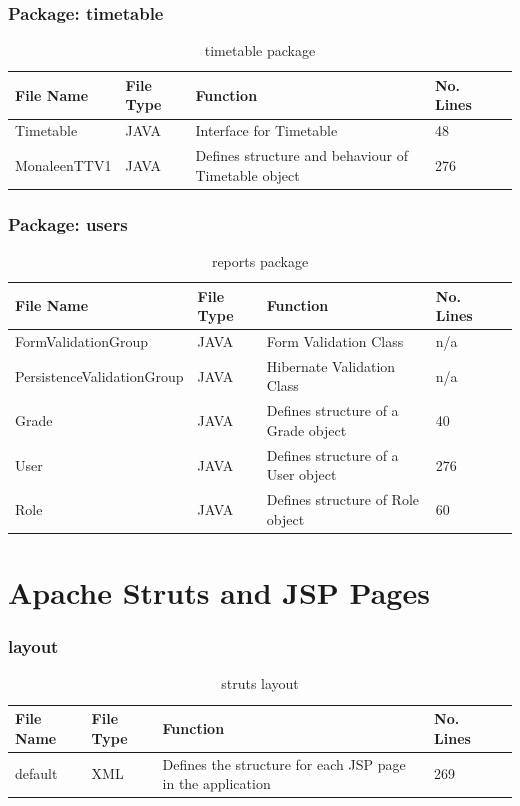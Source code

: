 \subsubsection{Package: timetable}
\begin{table}[H]
\begin{center}
    \begin{tabular}{| l | l | l| l |p{1cm} |}
    \hline
    File Name & File Type & Function & No. Lines\\ \hline
    Timetable & JAVA & Interface for Timetable & 48\\ \hline
	MonaleenTTV1 & JAVA & Defines structure and behaviour of Timetable object & 276\\ \hline
    \end{tabular}
\end{center}
\caption{timetable package}
\end{table}

\subsubsection{Package: users}
\begin{table}[H]
\begin{center}
    \begin{tabular}{| l | l | l| l |p{1cm} |}
    \hline
    File Name & File Type & Function & No. Lines\\ \hline
    FormValidationGroup & JAVA & Form Validation Class & n/a\\ \hline
	PersistenceValidationGroup & JAVA & Hibernate Validation Class & n/a\\ \hline
	Grade & JAVA & Defines structure of a Grade object& 40\\ \hline
	User & JAVA & Defines structure of a User object & 276\\ \hline
	Role & JAVA & Defines structure of Role object& 60\\ \hline	
    \end{tabular}
\end{center}
\caption{reports package}
\end{table}

\section{Apache Struts and JSP Pages}

\subsubsection{layout}
\begin{table}[H]
\begin{center}
   \begin{tabular}{| l | l | l| l |p{1cm} |}
    \hline
    File Name & File Type & Function & No. Lines\\ \hline
	default & XML & Defines the structure for each JSP page in the application & 269\\ \hline	
    \end{tabular}
\end{center}
\caption{struts layout}
\end{table}

